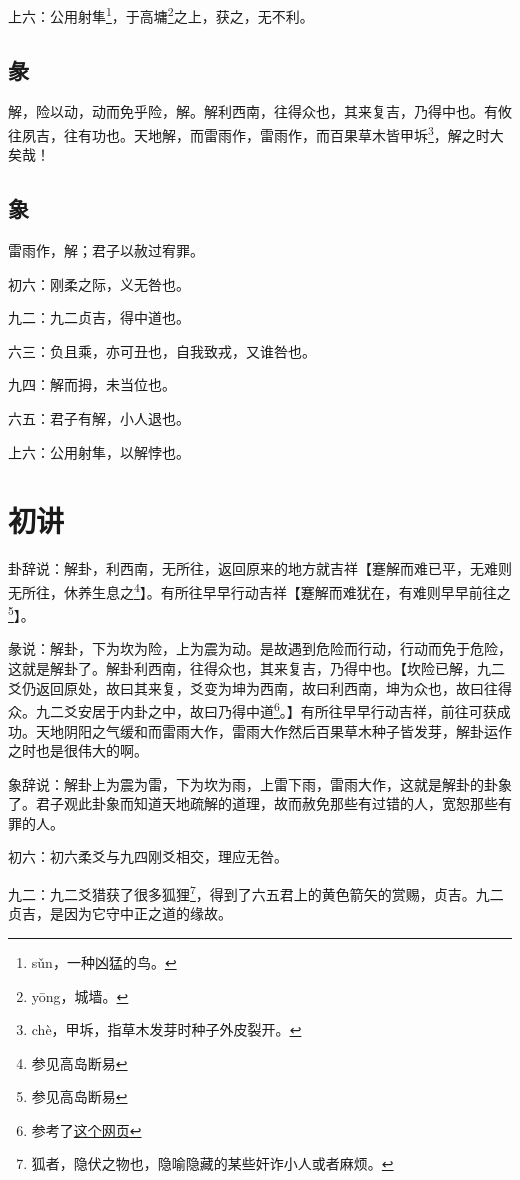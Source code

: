 \documentclass[12pt,oneside]{book}
\begin{document}
上六：公用射隼\footnote{sǔn，一种凶猛的鸟。}，于高墉\footnote{yōng，城墙。}之上，获之，无不利。

\subsection{彖}
解，险以动，动而免乎险，解。解利西南，往得众也，其来复吉，乃得中也。有攸往夙吉，往有功也。天地解，而雷雨作，雷雨作，而百果草木皆甲坼\footnote{chè，甲坼，指草木发芽时种子外皮裂开。}，解之时大矣哉！

\subsection{象}
雷雨作，解；君子以赦过宥罪。

初六：刚柔之际，义无咎也。

九二：九二贞吉，得中道也。

六三：负且乘，亦可丑也，自我致戎，又谁咎也。

九四：解而拇，未当位也。

六五：君子有解，小人退也。

上六：公用射隼，以解悖也。

\section{初讲}
卦辞说：解卦，利西南，无所往，返回原来的地方就吉祥【蹇解而难已平，无难则无所往，休养生息之\footnote{参见高岛断易}】。有所往早早行动吉祥【蹇解而难犹在，有难则早早前往之\footnote{参见高岛断易}】。

彖说：解卦，下为坎为险，上为震为动。是故遇到危险而行动，行动而免于危险，这就是解卦了。解卦利西南，往得众也，其来复吉，乃得中也。【坎险已解，九二爻仍返回原处，故曰其来复，爻变为坤为西南，故曰利西南，坤为众也，故曰往得众。九二爻安居于内卦之中，故曰乃得中道\footnote{参考了\href{https://www.eee-learning.com/book/neweee40}{这个网页}}。】有所往早早行动吉祥，前往可获成功。天地阴阳之气缓和而雷雨大作，雷雨大作然后百果草木种子皆发芽，解卦运作之时也是很伟大的啊。

象辞说：解卦上为震为雷，下为坎为雨，上雷下雨，雷雨大作，这就是解卦的卦象了。君子观此卦象而知道天地疏解的道理，故而赦免那些有过错的人，宽恕那些有罪的人。


初六：初六柔爻与九四刚爻相交，理应无咎。

九二：九二爻猎获了很多狐狸\footnote{狐者，隐伏之物也，隐喻隐藏的某些奸诈小人或者麻烦。}，得到了六五君上的黄色箭矢的赏赐，贞吉。九二贞吉，是因为它守中正之道的缘故。
\end{document}

